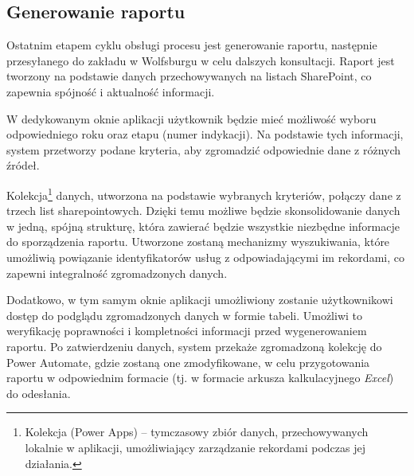 \subsection{Generowanie raportu}
Ostatnim etapem cyklu obsługi procesu jest generowanie raportu, następnie przesyłanego do zakładu w Wolfsburgu w celu dalszych konsultacji. Raport jest tworzony na podstawie danych przechowywanych na listach SharePoint, co zapewnia spójność i aktualność informacji.

W dedykowanym oknie aplikacji użytkownik będzie mieć możliwość wyboru odpowiedniego roku oraz etapu (numer indykacji). Na podstawie tych informacji, system przetworzy podane kryteria, aby zgromadzić odpowiednie dane z różnych źródeł.

Kolekcja\footnote{Kolekcja (Power Apps) -- tymczasowy zbiór danych, przechowywanych lokalnie w aplikacji, umożliwiający zarządzanie rekordami podczas jej działania.} danych, utworzona na podstawie wybranych kryteriów, połączy dane z trzech list sharepointowych. Dzięki temu możliwe będzie skonsolidowanie danych w jedną, spójną strukturę, która zawierać będzie wszystkie niezbędne informacje do sporządzenia raportu. Utworzone zostaną mechanizmy wyszukiwania, które umożliwią powiązanie identyfikatorów usług z odpowiadającymi im rekordami, co zapewni integralność zgromadzonych danych.

Dodatkowo, w tym samym oknie aplikacji umożliwiony zostanie użytkownikowi dostęp do podglądu zgromadzonych danych w formie tabeli. Umożliwi to weryfikację poprawności i kompletności informacji przed wygenerowaniem raportu. Po zatwierdzeniu danych, system przekaże zgromadzoną kolekcję do Power Automate, gdzie zostaną one zmodyfikowane, w celu przygotowania raportu w odpowiednim formacie (tj. w formacie arkusza kalkulacyjnego \emph{Excel}) do odesłania.

